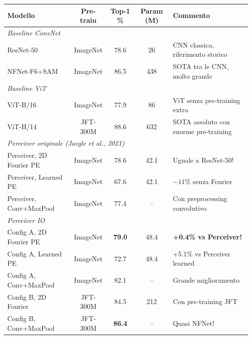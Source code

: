 \documentclass[12pt,a4paper]{article}
\begin{document}
\begin{center}
\footnotesize
\begin{tabular}{p{4.5cm}cccp{4cm}}
\toprule
\textbf{Modello} & \textbf{Pre-train} & \textbf{Top-1 \%} & \textbf{Param (M)} & \textbf{Commento} \\
\midrule
\multicolumn{5}{l}{\textit{Baseline ConvNet}} \\
ResNet-50 & ImageNet & 78.6 & 26 & CNN classica, riferimento storico \\
NFNet-F6+SAM & ImageNet & 86.5 & 438 & SOTA tra le CNN, molto grande \\
\midrule
\multicolumn{5}{l}{\textit{Baseline ViT}} \\
ViT-B/16 & ImageNet & 77.9 & 86 & ViT senza pre-training extra \\
ViT-H/14 & JFT-300M & 88.6 & 632 & SOTA assoluto con enorme pre-training \\
\midrule
\multicolumn{5}{l}{\textit{Perceiver originale (Jaegle et al., 2021)}} \\
Perceiver, 2D Fourier PE & ImageNet & 78.6 & 42.1 & Uguale a ResNet-50! \\
Perceiver, Learned PE & ImageNet & 67.6 & 42.1 & $-11\%$ senza Fourier \\
Perceiver, Conv+MaxPool & ImageNet & 77.4 & -- & Con preprocessing convolutivo \\
\midrule
\multicolumn{5}{l}{\textit{Perceiver IO}} \\
Config A, 2D Fourier PE & ImageNet & \textbf{79.0} & 48.4 & \textbf{+0.4\% vs Perceiver!} \\
Config A, Learned PE & ImageNet & 72.7 & 48.4 & +5.1\% vs Perceiver learned \\
Config A, Conv+MaxPool & ImageNet & 82.1 & -- & Grande miglioramento \\
Config B, 2D Fourier & JFT-300M & 84.5 & 212 & Con pre-training JFT \\
Config B, Conv+MaxPool & JFT-300M & \textbf{86.4} & -- & Quasi NFNet! \\
\bottomrule
\end{tabular}
\end{center}
\end{document}
